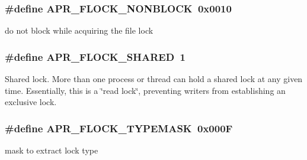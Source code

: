 \subsubsection[{\texorpdfstring{A\+P\+R\+\_\+\+F\+L\+O\+C\+K\+\_\+\+N\+O\+N\+B\+L\+O\+CK}{APR_FLOCK_NONBLOCK}}]{\setlength{\rightskip}{0pt plus 5cm}\#define A\+P\+R\+\_\+\+F\+L\+O\+C\+K\+\_\+\+N\+O\+N\+B\+L\+O\+CK~0x0010}\hypertarget{group__apr__file__lock__types_gab327fa0250e19006f20d5ec65fe7f22a}{}\label{group__apr__file__lock__types_gab327fa0250e19006f20d5ec65fe7f22a}
do not block while acquiring the file lock 
\subsubsection[{\texorpdfstring{A\+P\+R\+\_\+\+F\+L\+O\+C\+K\+\_\+\+S\+H\+A\+R\+ED}{APR_FLOCK_SHARED}}]{\setlength{\rightskip}{0pt plus 5cm}\#define A\+P\+R\+\_\+\+F\+L\+O\+C\+K\+\_\+\+S\+H\+A\+R\+ED~1}\hypertarget{group__apr__file__lock__types_gaba177fe81cd70b389753ad2096b2ce7c}{}\label{group__apr__file__lock__types_gaba177fe81cd70b389753ad2096b2ce7c}
Shared lock. More than one process or thread can hold a shared lock at any given time. Essentially, this is a \char`\"{}read lock\char`\"{}, preventing writers from establishing an exclusive lock. 
\subsubsection[{\texorpdfstring{A\+P\+R\+\_\+\+F\+L\+O\+C\+K\+\_\+\+T\+Y\+P\+E\+M\+A\+SK}{APR_FLOCK_TYPEMASK}}]{\setlength{\rightskip}{0pt plus 5cm}\#define A\+P\+R\+\_\+\+F\+L\+O\+C\+K\+\_\+\+T\+Y\+P\+E\+M\+A\+SK~0x000F}\hypertarget{group__apr__file__lock__types_ga40777e364fb20bb9a9ee57e74b19c13d}{}\label{group__apr__file__lock__types_ga40777e364fb20bb9a9ee57e74b19c13d}
mask to extract lock type 